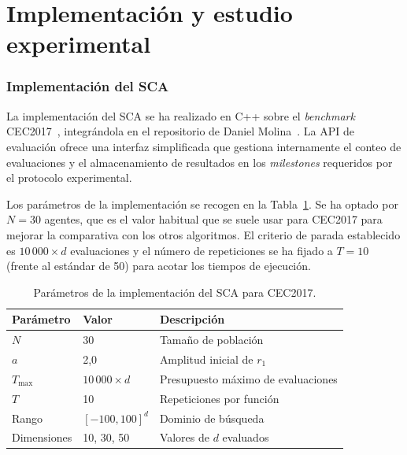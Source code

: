 \documentclass[12pt,a4paper]{article}
\begin{document}
\part{Implementación y estudio experimental}\label{part:implementacion_estudio_experimental}

\section{Implementación del SCA}
 
La implementación del SCA se ha realizado en C++ sobre el \textit{benchmark} CEC2017~\cite{cec2017}, integrándola en el repositorio de Daniel Molina~\cite{molina_repo}. La API de evaluación ofrece una interfaz simplificada que gestiona internamente el conteo de evaluaciones y el almacenamiento de resultados en los \textit{milestones} requeridos por el protocolo experimental.
 
Los parámetros de la implementación se recogen en la Tabla~\ref{tab:parametros_impl}. Se ha optado por $N=30$ agentes, que es el valor habitual que se suele usar para CEC2017 para mejorar la comparativa con los otros algoritmos. El criterio de parada establecido es $10\,000 \times d$ evaluaciones y el número de repeticiones se ha fijado a $T=10$ (frente al estándar de 50) para acotar los tiempos de ejecución.
 
\begin{table}[H]
\centering
\renewcommand{\arraystretch}{1.3}
\begin{tabular}{lll}
\toprule
\textbf{Parámetro} & \textbf{Valor} & \textbf{Descripción} \\
\midrule
$N$        & 30              & Tamaño de población \\
$a$        & 2{,}0           & Amplitud inicial de $r_1$ \\
$T_{\max}$ & $10\,000\times d$ & Presupuesto máximo de evaluaciones \\
$T$        & 10              & Repeticiones por función \\
Rango      & $[-100, 100]^d$ & Dominio de búsqueda \\
Dimensiones & 10, 30, 50    & Valores de $d$ evaluados \\
\bottomrule
\end{tabular}
\caption{Parámetros de la implementación del SCA para CEC2017.}
\label{tab:parametros_impl}
\end{table}
 
\end{document}
